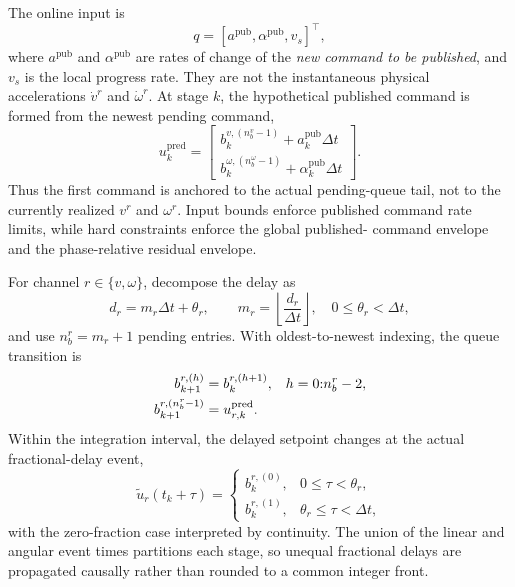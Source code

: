 The online input is
\begin{equation}
  q=[a^{\mathrm{pub}},\alpha^{\mathrm{pub}},v_s]^\top,
  \label{eq:ocp_input}
\end{equation}
where $a^{\mathrm{pub}}$ and $\alpha^{\mathrm{pub}}$ are rates of change of the
\emph{new command to be published}, and $v_s$ is the local progress rate.
They are not the instantaneous physical accelerations $\dot v^r$ and
$\dot\omega^r$.  At stage $k$, the hypothetical published command is formed
from the newest pending command,
\begin{equation}
  u_k^{\mathrm{pred}}=
  \begin{bmatrix}
    b_k^{v,(n_b^v-1)}+a_k^{\mathrm{pub}}\Delta t\\
    b_k^{\omega,(n_b^\omega-1)}+
      \alpha_k^{\mathrm{pub}}\Delta t
  \end{bmatrix}.
  \label{eq:solver_command_map}
\end{equation}
Thus the first command is anchored to the actual pending-queue tail, not to
the currently realized $v^r$ and $\omega^r$.  Input bounds enforce published
command rate limits, while hard constraints enforce the global published-
command envelope and the phase-relative residual envelope.

For channel $r\in\{v,\omega\}$, decompose the delay as
\begin{equation}
  d_r=m_r\Delta t+\theta_r,
  \qquad
  m_r=\left\lfloor\frac{d_r}{\Delta t}\right\rfloor,
  \quad 0\le\theta_r<\Delta t,
  \label{eq:fractional_delay}
\end{equation}
and use $n_b^r=m_r+1$ pending entries.  With oldest-to-newest indexing, the
queue transition is
\begin{align}
  b_{k+1}^{r,(h)}&=b_k^{r,(h+1)},
  &&h=0{:}n_b^r-2,
  \notag\\
  b_{k+1}^{r,(n_b^r-1)}&=u_{r,k}^{\mathrm{pred}}.
  \label{eq:buffer_shift}
\end{align}
Within the integration interval, the delayed setpoint changes at the actual
fractional-delay event,
\begin{equation}
  \widetilde u_r(t_k+\tau)=
  \begin{cases}
    b_k^{r,(0)},&0\le\tau<\theta_r,\\
    b_k^{r,(1)},&\theta_r\le\tau<\Delta t,
  \end{cases}
  \label{eq:fractional_delay_output}
\end{equation}
with the zero-fraction case interpreted by continuity.  The union of the
linear and angular event times partitions each stage, so unequal fractional
delays are propagated causally rather than rounded to a common integer front.

